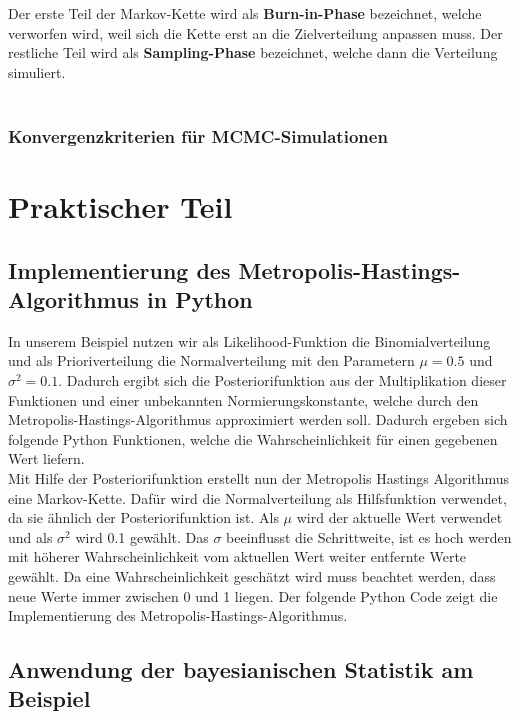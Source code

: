 \documentclass[a4paper,12pt]{article}
\begin{document}
Der erste Teil der Markov-Kette wird als \textbf{Burn-in-Phase} bezeichnet, welche verworfen wird, weil sich die Kette erst an die Zielverteilung anpassen muss. Der restliche Teil wird als \textbf{Sampling-Phase} bezeichnet, welche dann die Verteilung simuliert. \parencite[226f.]{HandbookMonteCarloMethods} \\\\

\subsubsection{Konvergenzkriterien für MCMC-Simulationen}
\newpage

\section{Praktischer Teil}

\subsection{Implementierung des Metropolis-Hastings-Algorithmus in Python}
In unserem Beispiel nutzen wir als Likelihood-Funktion die Binomialverteilung und als Prioriverteilung die Normalverteilung mit den Parametern $\mu = 0.5$ und $\sigma^2 = 0.1$. Dadurch ergibt sich die Posteriorifunktion aus der Multiplikation dieser Funktionen und einer unbekannten Normierungskonstante, welche durch den Metropolis-Hastings-Algorithmus approximiert werden soll. Dadurch ergeben sich folgende Python Funktionen, welche die Wahrscheinlichkeit für einen gegebenen Wert liefern.\\ 
 
Mit Hilfe der Posteriorifunktion erstellt nun der Metropolis Hastings Algorithmus eine Markov-Kette. Dafür wird die Normalverteilung als Hilfsfunktion verwendet, da sie ähnlich der Posteriorifunktion ist. Als $\mu$ wird der aktuelle Wert verwendet und als $\sigma^2$ wird 0.1 gewählt. Das $\sigma$ beeinflusst die Schrittweite, ist es hoch werden mit höherer Wahrscheinlichkeit vom aktuellen Wert weiter entfernte Werte gewählt. Da eine Wahrscheinlichkeit geschätzt wird muss beachtet werden, dass neue Werte immer zwischen 0 und 1 liegen. Der folgende Python Code zeigt die Implementierung des Metropolis-Hastings-Algorithmus. 
\newpage 
 
\newpage

\subsection{Anwendung der bayesianischen Statistik am Beispiel}
\end{document}
